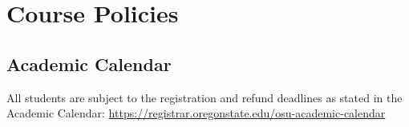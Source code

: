 \documentclass[10pt]{article}
\begin{document}


\clearpage
\section*{Course Policies}

\subsection*{Academic Calendar}
All students are subject to the registration and refund deadlines as stated in the Academic Calendar: 
\url{https://registrar.oregonstate.edu/osu-academic-calendar}
\end{document}
